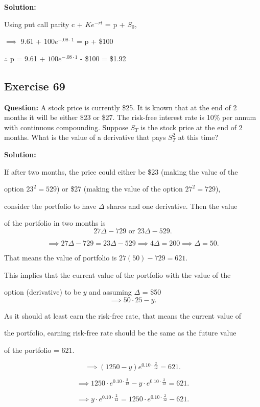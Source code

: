 \documentclass{article}
\begin{document}
\textbf{Solution:}

Using put call parity c + $Ke^{-rt}$ = p + $S_0$,

$\implies$ 9.61 + $100e^{-.08 \cdot 1}$ = p + \$100

$\therefore$ p = 9.61 + $100e^{-.08 \cdot 1}$ - \$100 = \$1.92

\subsection*{Exercise 69}
\textbf{Question:} A stock price is currently \$25. It is known that at the end of 2 months it will be either \$23 or \$27.
The risk-free interest rate is 10\% per annum with continuous compounding. Suppose $S_T$ is the stock price at the
end of 2 months. What is the value of a derivative that pays $S_T^{2}$ at this time?

\textbf{Solution:}

If after two months, the price could either be \$23 (making the value of the 

option $23^2 = 529$) or \$27 (making the value of the option $27^2 = 729$), 

consider the portfolio to have $\Delta$ shares and one derivative. Then the value 

of the portfolio in two months is
\[
27\Delta - 729 \text{ or } 23\Delta - 529.
\]

\[
\implies 27\Delta - 729 = 23\Delta - 529 \implies 4\Delta = 200 \implies \Delta = 50.
\]

That means the value of portfolio is $27(50) - 729 = 621$.

This implies that the current value of the portfolio with the value of the 

option (derivative) to be $y$ and assuming $\Delta$ = \$50
\[
\implies 50 \cdot 25 - y.
\]

As it should at least earn the risk-free rate, that means the current value of 

the portfolio, earning risk-free rate should be the same as the future value 

of the portfolio = $621$.

\[
\implies (1250 - y)e^{0.10 \cdot \frac{2}{12}} = 621.
\]

\[
\implies 1250 \cdot e^{0.10 \cdot \frac{2}{12}} - y \cdot e^{0.10 \cdot \frac{2}{12}} = 621.
\]

\[
\implies y \cdot e^{0.10 \cdot \frac{2}{12}} = 1250 \cdot e^{0.10 \cdot \frac{2}{12}} - 621.
\]
\end{document}
